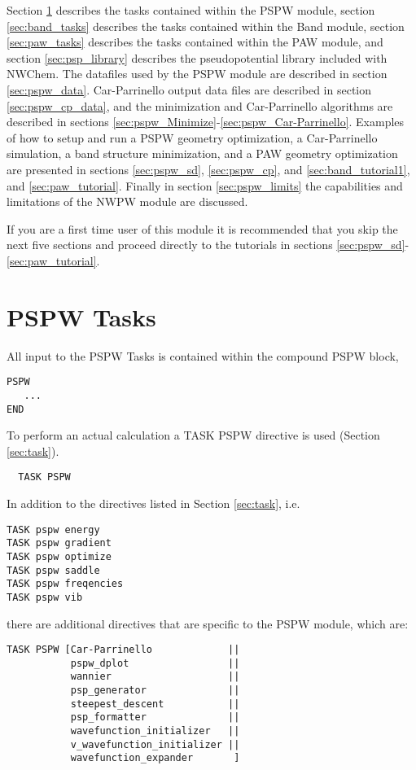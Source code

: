 Section \ref{sec:pspw_tasks} describes the tasks contained within the
PSPW module, section \ref{sec:band_tasks} describes the tasks
contained within the Band module, section \ref{sec:paw_tasks} describes
the tasks contained within the PAW module, and section \ref{sec:psp_library}
describes the pseudopotential library included with NWChem.  The
datafiles used by the PSPW module are described in section
\ref{sec:pspw_data}.  Car-Parrinello output data files are described
in section \ref{sec:pspw_cp_data}, and the minimization and
Car-Parrinello algorithms are described in sections
\ref{sec:pspw_Minimize}-\ref{sec:pspw_Car-Parrinello}. Examples of how
to setup and run a PSPW geometry optimization, a Car-Parrinello
simulation, a band structure minimization, and a PAW geometry
optimization are presented in sections \ref{sec:pspw_sd}, \ref{sec:pspw_cp}, and
\ref{sec:band_tutorial1}, and \ref{sec:paw_tutorial}.  
Finally in section \ref{sec:pspw_limits} the capabilities and limitations of the NWPW module are  discussed.

If you are a first time user of this module it is recommended that you skip the next five sections and proceed directly to the tutorials in sections 
\ref{sec:pspw_sd}-\ref{sec:paw_tutorial}.

\section{PSPW Tasks}
\label{sec:pspw_tasks}

All input to the PSPW Tasks is contained within the compound PSPW block,
\begin{verbatim}
PSPW
   ...
END
\end{verbatim}

To perform an actual calculation a TASK PSPW directive is used
(Section \ref{sec:task}).  
\begin{verbatim}
  TASK PSPW
\end{verbatim} 
In addition to the directives listed in Section \ref{sec:task}, i.e.
\begin{verbatim}
TASK pspw energy          
TASK pspw gradient         
TASK pspw optimize         
TASK pspw saddle           
TASK pspw freqencies       
TASK pspw vib
\end{verbatim}
there are additional directives that are specific to the PSPW module, which are:
\begin{verbatim}
TASK PSPW [Car-Parrinello             ||
           pspw_dplot                 ||
           wannier                    ||
           psp_generator              ||
           steepest_descent           ||
           psp_formatter              ||
           wavefunction_initializer   ||
           v_wavefunction_initializer ||
           wavefunction_expander       ]
\end{verbatim}


